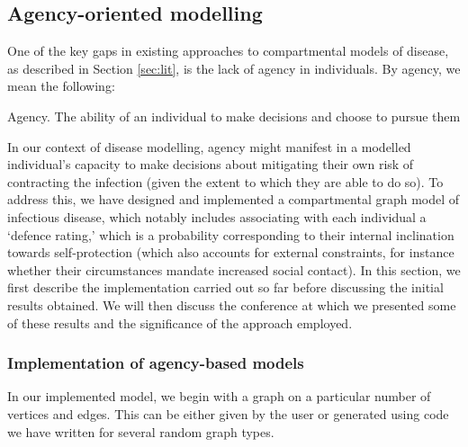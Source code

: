 \documentclass[../report.tex]{subfiles}
\begin{document}
\subsection{Agency-oriented modelling}

One of the key gaps in existing approaches to compartmental models of disease, as described in Section \ref{sec:lit}, is the lack of agency in individuals. By agency, we mean the following:
\theoremstyle{definition}
\begin{definition}{Agency.}
The ability of an individual to make decisions and choose to pursue them
\end{definition}
In our context of disease modelling, agency might manifest in a modelled individual's capacity to make decisions about mitigating their own risk of contracting the infection (given the extent to which they are able to do so). To address this, we have designed and implemented a compartmental graph model of infectious disease, which notably includes associating with each individual a `defence rating,' which is a probability corresponding to their internal inclination towards self-protection (which also accounts for external constraints, for instance whether their circumstances mandate increased social contact). In this section, we first describe the implementation carried out so far before discussing the initial results obtained. We will then discuss the conference at which we presented some of these results and the significance of the approach employed.



\subsubsection{Implementation of agency-based models}

In our implemented model, we begin with a graph on a particular number of vertices and edges. This can be either given by the user or generated using code we have written for several random graph types.
\end{document}
